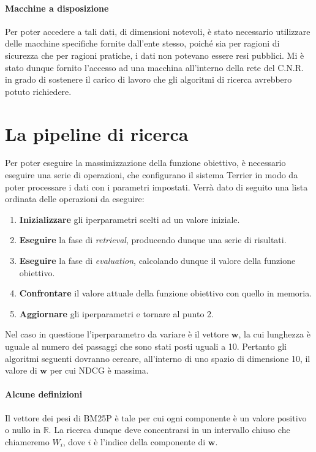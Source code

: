 \paragraph{Macchine a disposizione}
Per poter accedere a tali dati, di dimensioni notevoli, è stato necessario utilizzare
delle macchine specifiche fornite dall'ente stesso, poiché sia per ragioni di sicurezza
che per ragioni pratiche, i dati non potevano essere resi pubblici.
Mi è stato dunque fornito l'accesso ad una macchina 
all'interno della rete del C.N.R. in grado di sostenere il carico
di lavoro che gli algoritmi di ricerca avrebbero potuto richiedere.

\section{La pipeline di ricerca}
Per poter eseguire la massimizzazione della funzione obiettivo,
è necessario eseguire una serie di operazioni, che configurano il sistema Terrier
in modo da poter processare i dati con i parametri impostati.
Verrà dato di seguito una lista ordinata delle operazioni da eseguire:

\begin{enumerate}
	\item \textbf{Inizializzare} gli iperparametri scelti ad un valore iniziale.
	\item \textbf{Eseguire} la fase di \textit{retrieval}, producendo dunque una serie di risultati.
	\item \textbf{Eseguire} la fase di \textit{evaluation}, calcolando dunque il valore della funzione obiettivo.
	\item \textbf{Confrontare} il valore attuale della funzione obiettivo con quello in memoria.
	\item \textbf{Aggiornare} gli iperparametri e tornare al punto 2.
\end{enumerate}

Nel caso in questione l'iperparametro da variare è il vettore $\boldsymbol{w}$, la
cui lunghezza è uguale al numero dei passaggi che sono stati posti uguali a 10.
Pertanto gli algoritmi seguenti dovranno cercare, all'interno di uno spazio di dimensione
10, il valore di $\boldsymbol{w}$ per cui NDCG è massima.

\paragraph{Alcune definizioni}
Il vettore dei pesi di BM25P è tale per cui ogni componente è un valore
positivo o nullo in $\mathbb{R}$. La ricerca dunque deve concentrarsi
in un intervallo chiuso che chiameremo $W_i$, dove $i$ è l'indice 
della componente di $\boldsymbol{w}$.

